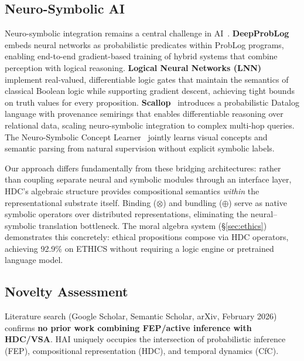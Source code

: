 \documentclass[10pt,letterpaper]{article}
\begin{document}
\subsection{Neuro-Symbolic AI}

Neuro-symbolic integration remains a central challenge in AI~\cite{garcez2020neurosymbolic}.
\textbf{DeepProbLog}~\cite{manhaeve2018deepproblog} embeds neural networks as probabilistic predicates within ProbLog programs, enabling end-to-end gradient-based training of hybrid systems that combine perception with logical reasoning.
\textbf{Logical Neural Networks (LNN)}~\cite{riegel2020logical} implement real-valued, differentiable logic gates that maintain the semantics of classical Boolean logic while supporting gradient descent, achieving tight bounds on truth values for every proposition.
\textbf{Scallop}~\cite{li2023scallop} introduces a probabilistic Datalog language with provenance semirings that enables differentiable reasoning over relational data, scaling neuro-symbolic integration to complex multi-hop queries.
The Neuro-Symbolic Concept Learner~\cite{mao2019neuro} jointly learns visual concepts and semantic parsing from natural supervision without explicit symbolic labels.

Our approach differs fundamentally from these bridging architectures: rather than coupling separate neural and symbolic modules through an interface layer, HDC's algebraic structure provides compositional semantics \emph{within} the representational substrate itself. Binding ($\otimes$) and bundling ($\oplus$) serve as native symbolic operators over distributed representations, eliminating the neural--symbolic translation bottleneck. The moral algebra system (\S\ref{sec:ethics}) demonstrates this concretely: ethical propositions compose via HDC operators, achieving 92.9\% on ETHICS without requiring a logic engine or pretrained language model.

\subsection{Novelty Assessment}

Literature search (Google Scholar, Semantic Scholar, arXiv, February 2026) confirms \textbf{no prior work combining FEP/active inference with HDC/VSA}. HAI uniquely occupies the intersection of probabilistic inference (FEP), compositional representation (HDC), and temporal dynamics (CfC).


\end{document}
